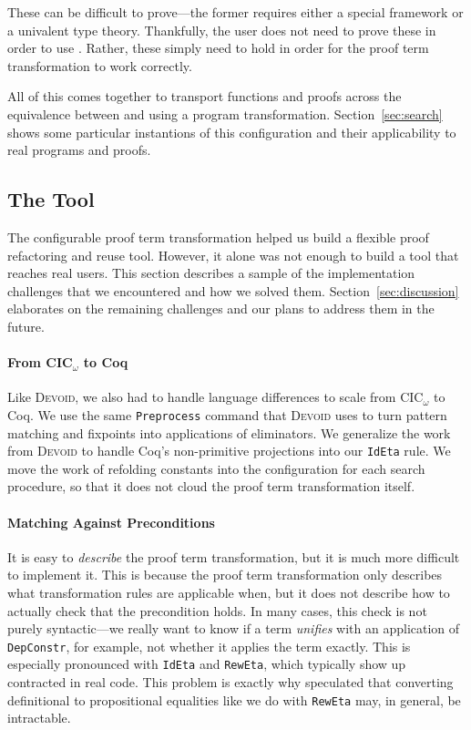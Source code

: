 These can be difficult to prove---the former requires either a special framework %
or a univalent type theory.
Thankfully, the user does not need to prove these in order to use \toolname.
Rather, these simply need to hold in order for the proof term transformation to work correctly.

All of this comes together to transport functions and proofs across the equivalence between \A and \B
using a program transformation.
Section~\ref{sec:search} shows some particular instantions of this configuration and their applicability to real programs and proofs.

\subsection{The Tool}
\label{sec:implementation}


The configurable proof term transformation helped us build a flexible proof refactoring and reuse tool.
However, it alone was not enough to build a tool that reaches real users.
This section describes a sample of the implementation challenges that we encountered and how we solved them.
Section~\ref{sec:discussion} elaborates on the remaining challenges and our plans to address them in the future.

\paragraph{From CIC$_{\omega}$ to Coq}

Like \textsc{Devoid}, we also had to handle language differences to scale from CIC$_{\omega}$ to Coq.
We use the same \lstinline{Preprocess} command that \textsc{Devoid} uses to turn pattern matching and fixpoints into applications of eliminators.
We generalize the work from \textsc{Devoid} to handle Coq's non-primitive projections into our \lstinline{IdEta} rule.
We move the work of refolding constants into the configuration for each search procedure, so that it does not
cloud the proof term transformation itself.

\paragraph{Matching Against Preconditions}

It is easy to \textit{describe} the proof term transformation, but it is much more difficult to implement it.
This is because the proof term transformation only describes what transformation rules are applicable when,
but it does not describe how to actually check that the precondition holds.
In many cases, this check is not purely syntactic---we really want to know if a term \textit{unifies}
with an application of \lstinline{DepConstr}, for example, not whether it applies the term exactly.
This is especially pronounced with \lstinline{IdEta} and \lstinline{RewEta},
which typically show up contracted in real code.
This problem is exactly why \citet{tabareau2019marriage} speculated that converting definitional to propositional equalities
like we do with \lstinline{RewEta} may, in general, be intractable.

